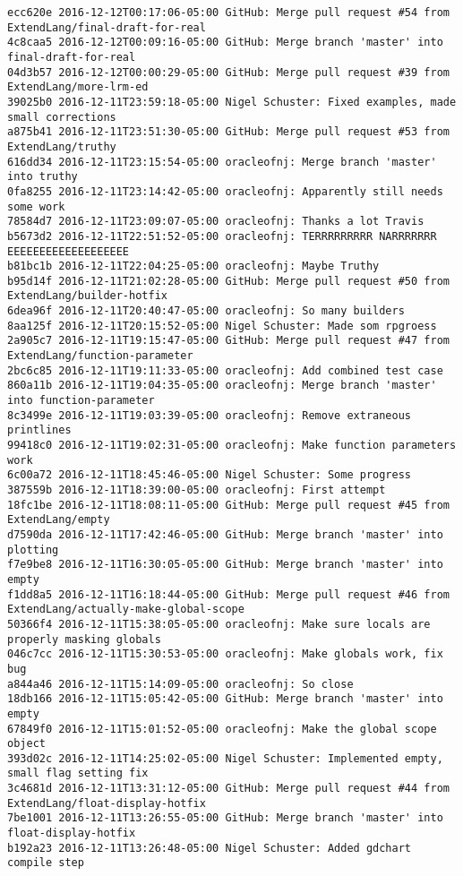 \begin{lstlisting}
ecc620e 2016-12-12T00:17:06-05:00 GitHub: Merge pull request #54 from ExtendLang/final-draft-for-real
4c8caa5 2016-12-12T00:09:16-05:00 GitHub: Merge branch 'master' into final-draft-for-real
04d3b57 2016-12-12T00:00:29-05:00 GitHub: Merge pull request #39 from ExtendLang/more-lrm-ed
39025b0 2016-12-11T23:59:18-05:00 Nigel Schuster: Fixed examples, made small corrections
a875b41 2016-12-11T23:51:30-05:00 GitHub: Merge pull request #53 from ExtendLang/truthy
616dd34 2016-12-11T23:15:54-05:00 oracleofnj: Merge branch 'master' into truthy
0fa8255 2016-12-11T23:14:42-05:00 oracleofnj: Apparently still needs some work
78584d7 2016-12-11T23:09:07-05:00 oracleofnj: Thanks a lot Travis
b5673d2 2016-12-11T22:51:52-05:00 oracleofnj: TERRRRRRRRR NARRRRRRR EEEEEEEEEEEEEEEEEEE
b81bc1b 2016-12-11T22:04:25-05:00 oracleofnj: Maybe Truthy
b95d14f 2016-12-11T21:02:28-05:00 GitHub: Merge pull request #50 from ExtendLang/builder-hotfix
6dea96f 2016-12-11T20:40:47-05:00 oracleofnj: So many builders
8aa125f 2016-12-11T20:15:52-05:00 Nigel Schuster: Made som rpgroess
2a905c7 2016-12-11T19:15:47-05:00 GitHub: Merge pull request #47 from ExtendLang/function-parameter
2bc6c85 2016-12-11T19:11:33-05:00 oracleofnj: Add combined test case
860a11b 2016-12-11T19:04:35-05:00 oracleofnj: Merge branch 'master' into function-parameter
8c3499e 2016-12-11T19:03:39-05:00 oracleofnj: Remove extraneous printlines
99418c0 2016-12-11T19:02:31-05:00 oracleofnj: Make function parameters work
6c00a72 2016-12-11T18:45:46-05:00 Nigel Schuster: Some progress
387559b 2016-12-11T18:39:00-05:00 oracleofnj: First attempt
18fc1be 2016-12-11T18:08:11-05:00 GitHub: Merge pull request #45 from ExtendLang/empty
d7590da 2016-12-11T17:42:46-05:00 GitHub: Merge branch 'master' into plotting
f7e9be8 2016-12-11T16:30:05-05:00 GitHub: Merge branch 'master' into empty
f1dd8a5 2016-12-11T16:18:44-05:00 GitHub: Merge pull request #46 from ExtendLang/actually-make-global-scope
50366f4 2016-12-11T15:38:05-05:00 oracleofnj: Make sure locals are properly masking globals
046c7cc 2016-12-11T15:30:53-05:00 oracleofnj: Make globals work, fix bug
a844a46 2016-12-11T15:14:09-05:00 oracleofnj: So close
18db166 2016-12-11T15:05:42-05:00 GitHub: Merge branch 'master' into empty
67849f0 2016-12-11T15:01:52-05:00 oracleofnj: Make the global scope object
393d02c 2016-12-11T14:25:02-05:00 Nigel Schuster: Implemented empty, small flag setting fix
3c4681d 2016-12-11T13:31:12-05:00 GitHub: Merge pull request #44 from ExtendLang/float-display-hotfix
7be1001 2016-12-11T13:26:55-05:00 GitHub: Merge branch 'master' into float-display-hotfix
b192a23 2016-12-11T13:26:48-05:00 Nigel Schuster: Added gdchart compile step

\end{lstlisting}
